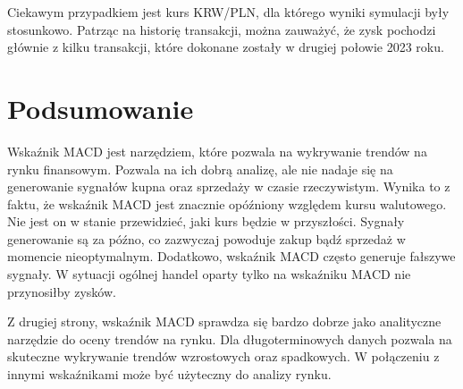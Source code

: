 \documentclass[12pt, a4paper]{article}
\begin{document}
Ciekawym przypadkiem jest kurs KRW/PLN, dla którego wyniki symulacji były stosunkowo. Patrząc
na historię transakcji, można zauważyć, że zysk pochodzi głównie z kilku transakcji, które
dokonane zostały w drugiej połowie 2023 roku.

\section{Podsumowanie}
Wskaźnik MACD jest narzędziem, które pozwala na wykrywanie trendów na rynku finansowym.
Pozwala na ich dobrą analizę, ale nie nadaje się na generowanie sygnałów kupna oraz sprzedaży
w czasie rzeczywistym. Wynika to z faktu, że wskaźnik MACD jest znacznie opóźniony
względem kursu walutowego. Nie jest on w stanie przewidzieć, jaki kurs będzie
w przyszłości. Sygnały generowanie są za późno, co zazwyczaj powoduje
zakup bądź sprzedaż w momencie nieoptymalnym. Dodatkowo, wskaźnik MACD często
generuje fałszywe sygnały. W sytuacji ogólnej handel oparty tylko
na wskaźniku MACD nie przynosiłby zysków.

Z drugiej strony, wskaźnik MACD sprawdza się bardzo dobrze jako analityczne narzędzie
do oceny trendów na rynku. Dla długoterminowych danych pozwala na skuteczne
wykrywanie trendów wzrostowych oraz spadkowych. W połączeniu z innymi wskaźnikami
może być użyteczny do analizy rynku.
\end{document}
